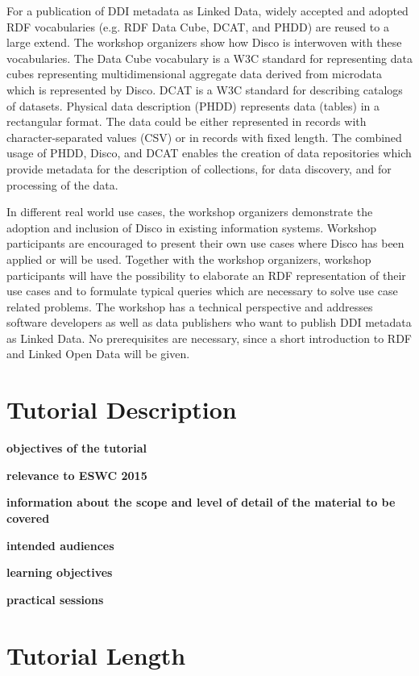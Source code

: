 \documentclass{llncs}
\begin{document}
For a publication of DDI metadata as Linked Data, widely accepted and adopted RDF vocabularies (e.g. RDF Data Cube, DCAT, and PHDD) are reused to a large extend. The workshop organizers show how Disco is interwoven with these vocabularies. The Data Cube vocabulary is a W3C standard for representing data cubes representing multidimensional aggregate data derived from microdata which is represented by Disco. DCAT is a W3C standard for describing catalogs of datasets. Physical data description (PHDD) represents data (tables) in a rectangular format. The data could be either represented in records with character-separated values (CSV) or in records with fixed length. The combined usage of PHDD, Disco, and DCAT enables the creation of data repositories which provide metadata for the description of collections, for data discovery, and for processing of the data.
 
In different real world use cases, the workshop organizers demonstrate the adoption and inclusion of Disco in existing information systems. Workshop participants are encouraged to present their own use cases where Disco has been applied or will be used. Together with the workshop organizers, workshop participants will have the possibility to elaborate an RDF representation of their use cases and to formulate typical queries which are necessary to solve use case related problems.
The workshop has a technical perspective and addresses software developers as well as data publishers who want to publish DDI metadata as Linked Data. No prerequisites are necessary, since a short introduction to RDF and Linked Open Data will be given.

\section{Tutorial Description}

\textbf{objectives of the tutorial} 

\textbf{relevance to ESWC 2015}

\textbf{information about the scope and level of detail of the material to be covered}

\textbf{intended audiences}

\textbf{learning objectives}

\textbf{practical sessions}

\section{Tutorial Length}
\end{document}
